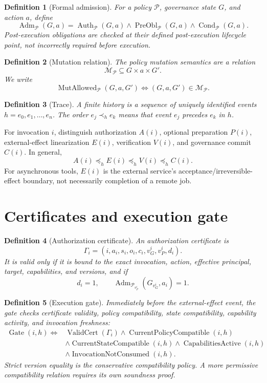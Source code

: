 \documentclass[11pt,a4paper]{article}
\newtheorem{definition}{Definition}[section]
\theoremstyle{remark}
\newcommand{\Adm}{\operatorname{Adm}}
\newcommand{\Gate}{\operatorname{Gate}}
\newcommand{\MutAllowed}{\operatorname{MutAllowed}}
\newcommand{\ValidCert}{\operatorname{ValidCert}}
\begin{document}
\begin{definition}[Formal admission]
For a policy $\mathcal P$, governance state $G$, and action $a$, define
\[
\Adm_{\mathcal P}(G,a)=
\operatorname{Auth}_{\mathcal P}(G,a)
\land\operatorname{PreObl}_{\mathcal P}(G,a)
\land\operatorname{Cond}_{\mathcal P}(G,a).
\]
Post-execution obligations are checked at their defined post-execution lifecycle point, not incorrectly required before execution.
\end{definition}

\begin{definition}[Mutation relation]
The policy mutation semantics are a relation
\[
\mathcal M_{\mathcal P}\subseteq G\times a\times G'.
\]
We write
\[
\MutAllowed_{\mathcal P}(G,a,G')
\iff (G,a,G')\in\mathcal M_{\mathcal P}.
\]
\end{definition}

\begin{definition}[Trace]
A finite history is a sequence of uniquely identified events
$h=e_0,e_1,\ldots,e_n$. The order $e_j\prec_h e_k$ means that event $e_j$ precedes $e_k$ in $h$.
\end{definition}

For invocation $i$, distinguish authorization $A(i)$, optional preparation $P(i)$, external-effect linearization $E(i)$, verification $V(i)$, and governance commit $C(i)$. In general,
\[
A(i)\preceq_h E(i)\preceq_h V(i)\preceq_h C(i).
\]
For asynchronous tools, $E(i)$ is the external service's acceptance/irreversible-effect boundary, not necessarily completion of a remote job.

\section{Certificates and execution gate}

\begin{definition}[Authorization certificate]
An authorization certificate is
\[
\Gamma_i=(i,a_i,s_i,o_i,c_i,v_G^i,v_P^i,d_i).
\]
It is valid only if it is bound to the exact invocation, action, effective principal, target, capabilities, and versions, and if
\[
d_i=1,\qquad
\Adm_{\mathcal P_{v_P^i}}(G_{v_G^i},a_i)=1.
\]
\end{definition}

\begin{definition}[Execution gate]
Immediately before the external-effect event, the gate checks certificate validity, policy compatibility, state compatibility, capability activity, and invocation freshness:
\[
\begin{split}
\Gate(i,h)\iff{}&
\ValidCert(\Gamma_i)
\land \operatorname{CurrentPolicyCompatible}(i,h)\\
&\land\operatorname{CurrentStateCompatible}(i,h)
\land\operatorname{CapabilitiesActive}(i,h)\\
&\land\operatorname{InvocationNotConsumed}(i,h).
\end{split}
\]
Strict version equality is the conservative compatibility policy. A more permissive compatibility relation requires its own soundness proof.
\end{definition}
\end{document}
